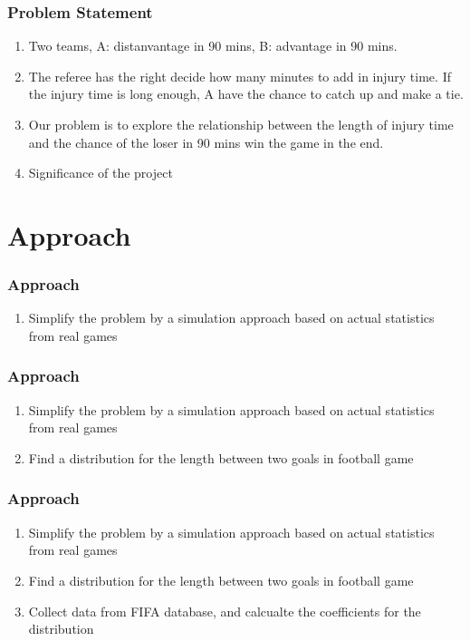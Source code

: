 \documentclass[compress,handout,10pt]{beamer}
\let\olditem\item
\renewcommand{\item}{\setlength{\itemsep}{0.5\baselineskip}\olditem}
\begin{document}
\begin{frame}
    \frametitle{Problem Statement}
     \begin{enumerate}
         \item Two teams, A: distanvantage in 90 mins, B: advantage in 90 mins.
         \item  The referee has the right decide how many minutes to add in injury time.  If the injury time is long enough, A have the chance to catch up and make a tie.
         \item Our problem is to explore the relationship between the length of injury time and the chance of the loser in 90 mins win the game in the end.
         \item Significance of the project
     \end{enumerate}
\end{frame}

\section{Approach}
\begin{frame}
    \frametitle{Approach}
       \begin{enumerate}
         \item  Simplify the problem by a simulation approach based on actual statistics from real games 
     \end{enumerate}
\end{frame}

\begin{frame}
    \frametitle{Approach}
       \begin{enumerate}
         \item  Simplify the problem by a simulation approach based on actual statistics from real games
         \item  Find a distribution for the length between two goals in football game
     \end{enumerate}
\end{frame}

\begin{frame}
    \frametitle{Approach} 
       \begin{enumerate}
         \item  Simplify the problem by a simulation approach based on actual statistics from real games
\cite{IMM1978}
         \item  Find a distribution for the length between two goals in football game
         \item  Collect data from FIFA database, and calcualte the coefficients for the distribution
     \end{enumerate}
\end{frame}
\end{document}
